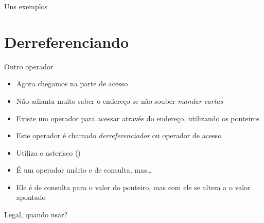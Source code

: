 \documentclass[14pt]{beamer}
\begin{document}
		\begin{frame}{Uns exemplos}
			\presentationPause
		\end{frame}

	\section{Derreferenciando}
		\begin{frame}{Outro operador}
			\begin{itemize}
				\presentationPause\item Agora chegamos na parte de acesso
				\presentationPause\item Não adianta muito saber o endereço se não souber \textit{mandar cartas}
				\presentationPause\item Existe um operador para acessar através do endereço, utilizando os ponteiros
				\presentationPause\item Este operador é chamado \emph{derreferenciador} \presentationPause ou operador de acesso
				\presentationPause\item Utiliza o asterisco (\basicCode{*})
				\presentationPause\item É um operador unário e de consulta\presentationPause, mas\dots
				\presentationPause\item Ele é de consulta para o valor do ponteiro, mas com ele se altera a o valor apontado
			\end{itemize}
			\presentationPause
		\end{frame}

		\begin{frame}{Legal, quando usar?}
			\presentationPause
		\end{frame}
\end{document}
